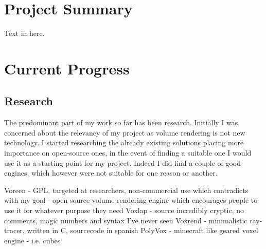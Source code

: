 \documentclass[11pt,fleqn,twoside]{article}
\begin{document}

\mmp

\setcounter{tocdepth}{3} %
\tableofcontents

\newpage

\section{Project Summary}
Text in here.

\section{Current Progress}


\subsection{Research}
The predominant part of my work so far has been research. Initially I was concerned about the relevancy of my project as volume rendering is not new technology. I started researching the already existing solutions placing more importance on open-source ones, in the event of finding a suitable one I would use it as a starting point for my project. Indeed I did find a couple of good engines, which however were not suitable for one reason or another.

Voreen - GPL, targeted at researchers, non-commercial use which contradicts with my goal - open source volume rendering engine which encourages people to use it for whatever purpose they need
Voxlap - source incredibly cryptic, no comments, magic numbers and syntax I've never seen
Voxrend - minimalistic ray-tracer, written in C, sourcecode in spanish
PolyVox - minecraft like geared voxel engine - i.e. cubes
\end{document}
